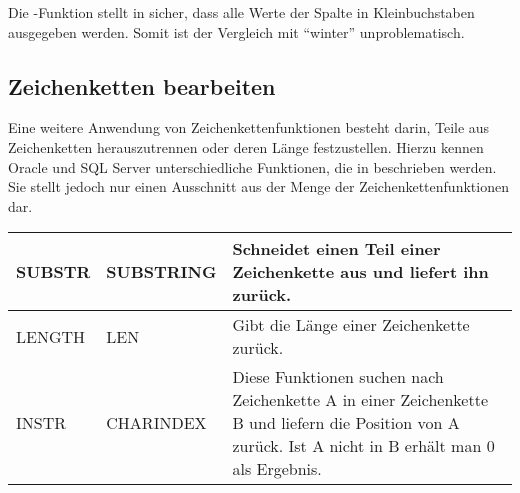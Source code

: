         Die -Funktion stellt in  sicher, dass alle Werte der Spalte  in Kleinbuchstaben ausgegeben werden. Somit ist der Vergleich mit \enquote{winter} unproblematisch.
      \subsection{Zeichenketten bearbeiten}
        Eine weitere Anwendung von Zeichenkettenfunktionen besteht darin, Teile aus Zeichenketten herauszutrennen oder deren Länge festzustellen. Hierzu kennen Oracle und SQL Server unterschiedliche Funktionen, die in  beschrieben werden. Sie stellt jedoch nur einen Ausschnitt aus der Menge der Zeichenkettenfunktionen dar.
        \begin{center}
          \label{srfstringfct2}
          \begin{small}
            \tabletail{
              \hline
            }
            \tablelasttail {
              \hline
            }
            \begin{supertabular}{|l|l|p{10cm}|}
              SUBSTR & SUBSTRING &  Schneidet einen Teil einer Zeichenkette aus und liefert ihn zurück. \\
              \hline
              LENGTH & LEN &  Gibt die Länge einer Zeichenkette zurück. \\
              \hline
              INSTR & CHARINDEX & Diese Funktionen suchen nach Zeichenkette A in
              einer Zeichenkette B und liefern die Position von A zurück. Ist
              A nicht in B erhält man 0 als Ergebnis. \\
            \end{supertabular}
          \end{small}
        \end{center}
